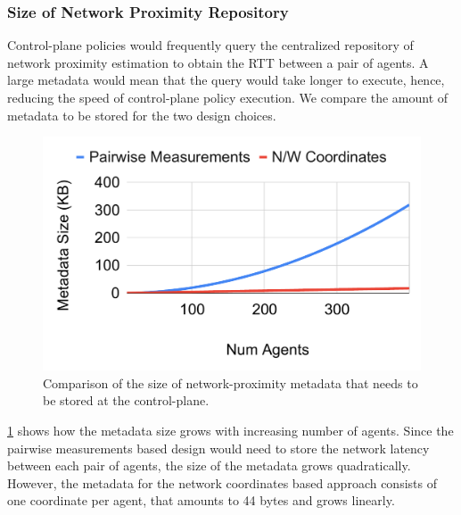 \subsubsection{Size of Network Proximity Repository}
Control-plane policies would frequently query the centralized repository of network proximity estimation to obtain the RTT between a pair of agents. A large metadata would mean that the query would take longer to execute, hence, reducing the speed of control-plane policy execution. We compare the amount of metadata to be stored for the two design choices. 

\begin{figure}
\centering
\includegraphics[width=0.75\linewidth]{figures/design_space/nw_prox/metadata_size.pdf}
\caption{Comparison of the size of network-proximity metadata that needs to be stored at the control-plane.}
\label{fig:metadata_size}
\end{figure}

\par \cref{fig:metadata_size} shows how the metadata size grows with increasing number of agents. Since the pairwise measurements based design would need to store the network latency between each pair of agents, the size of the metadata grows quadratically. However, the metadata for the network coordinates based approach consists of one coordinate per agent, that amounts to 44 bytes and grows linearly.

